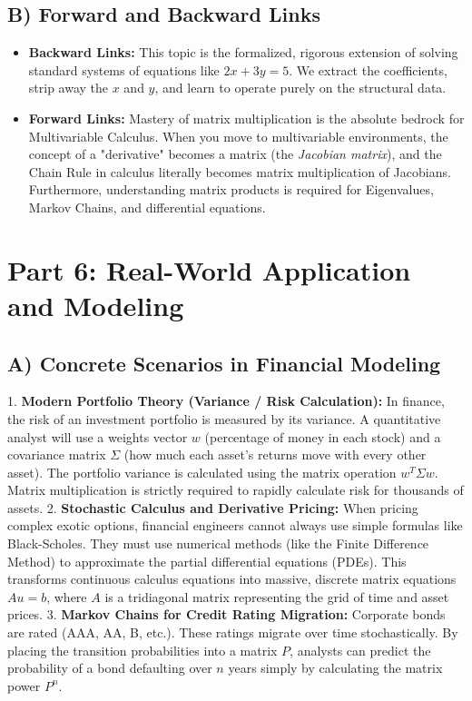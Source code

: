 \documentclass{article}
\begin{document}
\subsection*{B) Forward and Backward Links}
\begin{itemize}
    \item \textbf{Backward Links:} This topic is the formalized, rigorous extension of solving standard systems of equations like $2x + 3y = 5$. We extract the coefficients, strip away the $x$ and $y$, and learn to operate purely on the structural data. 
    \item \textbf{Forward Links:} Mastery of matrix multiplication is the absolute bedrock for Multivariable Calculus. When you move to multivariable environments, the concept of a "derivative" becomes a matrix (the \textit{Jacobian matrix}), and the Chain Rule in calculus literally becomes matrix multiplication of Jacobians. Furthermore, understanding matrix products is required for Eigenvalues, Markov Chains, and differential equations.
\end{itemize}

\section*{Part 6: Real-World Application and Modeling}

\subsection*{A) Concrete Scenarios in Financial Modeling}
1. \textbf{Modern Portfolio Theory (Variance / Risk Calculation):} In finance, the risk of an investment portfolio is measured by its variance. A quantitative analyst will use a weights vector $w$ (percentage of money in each stock) and a covariance matrix $\Sigma$ (how much each asset's returns move with every other asset). The portfolio variance is calculated using the matrix operation $w^T \Sigma w$. Matrix multiplication is strictly required to rapidly calculate risk for thousands of assets.
2. \textbf{Stochastic Calculus and Derivative Pricing:} When pricing complex exotic options, financial engineers cannot always use simple formulas like Black-Scholes. They must use numerical methods (like the Finite Difference Method) to approximate the partial differential equations (PDEs). This transforms continuous calculus equations into massive, discrete matrix equations $Au = b$, where $A$ is a tridiagonal matrix representing the grid of time and asset prices.
3. \textbf{Markov Chains for Credit Rating Migration:} Corporate bonds are rated (AAA, AA, B, etc.). These ratings migrate over time stochastically. By placing the transition probabilities into a matrix $P$, analysts can predict the probability of a bond defaulting over $n$ years simply by calculating the matrix power $P^n$.
\end{document}
